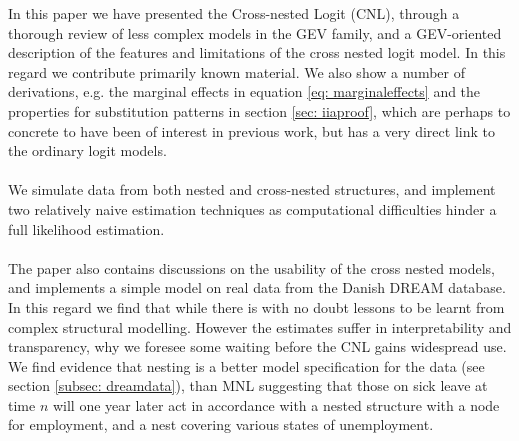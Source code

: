 
In this paper we have presented the Cross-nested Logit (CNL), through a thorough review of less complex models in the GEV family, and a GEV-oriented description of the features and limitations of the cross nested logit model. In this regard we contribute primarily known material. We also show a number of derivations, e.g. the marginal effects in equation \eqref{eq: marginaleffects} and the properties for substitution patterns in section \ref{sec: iiaproof}, which are perhaps to concrete to have been of interest in previous work, but has a very direct link to the ordinary logit models.
\\ \\
We simulate data from both nested and cross-nested structures, and implement two relatively naive estimation techniques as computational difficulties hinder a full likelihood estimation.
\\ \\
The paper also contains discussions on the usability of the cross nested models, and implements a simple model on real data from the Danish DREAM database. In this regard we find that while there is with no doubt lessons to be learnt from complex structural modelling. However the estimates suffer in interpretability and transparency, why we foresee some waiting before the CNL gains widespread use. We find evidence that nesting is a better model specification for the data (see section \ref{subsec: dreamdata}), than MNL suggesting that those on sick leave at time $n$ will one year later act in accordance with a nested structure with a node for employment, and a nest covering various states of unemployment.

